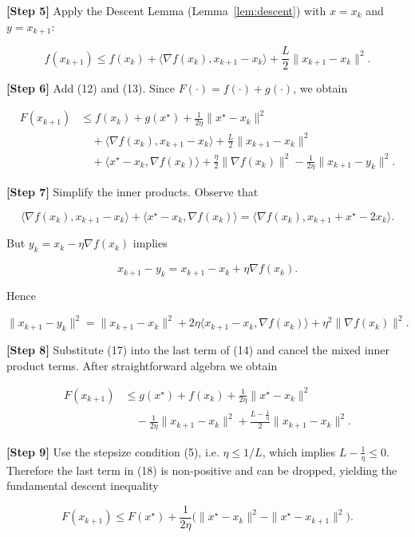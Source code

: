 \documentclass{article}
\begin{document}
\noindent\textbf{[Step 5]} Apply the Descent Lemma (Lemma~\ref{lem:descent}) with $x=x_{k}$ and $y=x_{k+1}$:

\[
f(x_{k+1})\le f(x_{k})+\langle\nabla f(x_{k}),x_{k+1}-x_{k}\rangle+\frac{L}{2}\|x_{k+1}-x_{k}\|^{2}.
\tag{13}
\]

\noindent\textbf{[Step 6]} Add (12) and (13).  
Since $F(\cdot)=f(\cdot)+g(\cdot)$, we obtain

\[
\begin{aligned}
F(x_{k+1}) &\le f(x_{k})+g(x^{\star})+\frac{1}{2\eta}\|x^{\star}-x_{k}\|^{2}\\
&\quad+\langle\nabla f(x_{k}),x_{k+1}-x_{k}\rangle
+\frac{L}{2}\|x_{k+1}-x_{k}\|^{2}\\
&\quad+\langle x^{\star}-x_{k},\nabla f(x_{k})\rangle
+\frac{\eta}{2}\|\nabla f(x_{k})\|^{2}
-\frac{1}{2\eta}\|x_{k+1}-y_{k}\|^{2}.
\end{aligned}
\tag{14}
\]

\noindent\textbf{[Step 7]} Simplify the inner products.  
Observe that

\[
\langle\nabla f(x_{k}),x_{k+1}-x_{k}\rangle
+\langle x^{\star}-x_{k},\nabla f(x_{k})\rangle
= \langle\nabla f(x_{k}),x_{k+1}+x^{\star}-2x_{k}\rangle.
\tag{15}
\]

But $y_{k}=x_{k}-\eta\nabla f(x_{k})$ implies  

\[
x_{k+1}-y_{k}=x_{k+1}-x_{k}+\eta\nabla f(x_{k}).
\tag{16}
\]

Hence  

\[
\|x_{k+1}-y_{k}\|^{2}
= \|x_{k+1}-x_{k}\|^{2}+2\eta\langle x_{k+1}-x_{k},\nabla f(x_{k})\rangle+\eta^{2}\|\nabla f(x_{k})\|^{2}.
\tag{17}
\]

\noindent\textbf{[Step 8]} Substitute (17) into the last term of (14) and cancel the mixed inner product terms. After straightforward algebra we obtain

\[
\begin{aligned}
F(x_{k+1})
&\le g(x^{\star})+f(x_{k})+\frac{1}{2\eta}\|x^{\star}-x_{k}\|^{2}\\
&\quad -\frac{1}{2\eta}\|x_{k+1}-x_{k}\|^{2}
+\frac{L-\frac{1}{\eta}}{2}\|x_{k+1}-x_{k}\|^{2}.
\end{aligned}
\tag{18}
\]

\noindent\textbf{[Step 9]} Use the stepsize condition (5), i.e. $\eta\le 1/L$, which implies $L-\frac{1}{\eta}\le0$. Therefore the last term in (18) is non‑positive and can be dropped, yielding the fundamental descent inequality

\[
F(x_{k+1})\le F(x^{\star})+\frac{1}{2\eta}\bigl(\|x^{\star}-x_{k}\|^{2}-\|x^{\star}-x_{k+1}\|^{2}\bigr).
\tag{19}
\]
\end{document}
